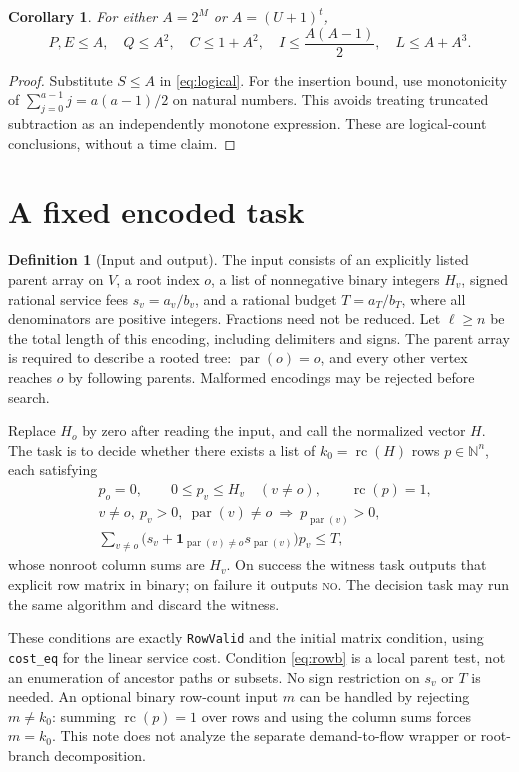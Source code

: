 \documentclass[11pt,a4paper]{article}
\newtheorem{corollary}[theorem]{Corollary}
\theoremstyle{definition}
\newtheorem{definition}[theorem]{Definition}
\theoremstyle{remark}
\newcommand{\NN}{\mathbb N}
\newcommand{\pa}{\operatorname{par}}
\newcommand{\RC}{\operatorname{rc}}
\begin{document}
\begin{corollary}\label{cor:envelope}
For either \(A=2^M\) or \(A=(U+1)^t\),
\[
 P,E\le A,\quad Q\le A^2,\quad C\le1+A^2,\quad
 I\le\frac{A(A-1)}2,\quad L\le A+A^3.
\]
\end{corollary}
\begin{proof}
Substitute \(S\le A\) in \eqref{eq:logical}. For the insertion bound,
use monotonicity of \(\sum_{j=0}^{a-1}j=a(a-1)/2\) on natural numbers.
This avoids treating truncated subtraction as an independently monotone
expression. These are logical-count conclusions, without a time claim.
\end{proof}

\section{A fixed encoded task}\label{sec:task}
\begin{definition}[Input and output]\label{def:task}
The input consists of an explicitly listed parent array on \(V\), a root
index \(o\), a list of nonnegative binary integers \(H_v\), signed rational
service fees \(s_v=a_v/b_v\), and a rational budget \(T=a_T/b_T\), where
all denominators are positive integers. Fractions need not be reduced.
Let \(\ell\ge n\) be the total length of this encoding, including delimiters
and signs. The parent array is required to describe a rooted tree:
\(\pa(o)=o\), and every other vertex reaches \(o\) by following parents.
Malformed encodings may be rejected before search.

Replace \(H_o\) by zero after reading the input, and call the normalized
vector \(H\). The task is to decide whether there exists a list of
\(k_0=\RC(H)\) rows \(p\in\NN^n\), each satisfying
\begin{align}
 &p_o=0,\qquad 0\le p_v\le H_v\quad(v\ne o),\qquad\RC(p)=1,
       \label{eq:rowa}\\
 &v\ne o,\ p_v>0,\ \pa(v)\ne o\ \Longrightarrow\ p_{\pa(v)}>0,
       \label{eq:rowb}\\
 &\sum_{v\ne o}\bigl(s_v+\mathbf1_{\pa(v)\ne o}s_{\pa(v)}\bigr)p_v\le T,
       \label{eq:rowc}
\end{align}
whose nonroot column sums are \(H_v\). On success the witness task outputs
that explicit row matrix in binary; on failure it outputs \textsc{no}.
The decision task may run the same algorithm and discard the witness.
\end{definition}

These conditions are exactly \texttt{RowValid} and the initial matrix
condition, using \texttt{cost\_eq} for the linear service cost. Condition
\eqref{eq:rowb} is a local parent test, not an enumeration of ancestor paths
or subsets. No sign restriction on \(s_v\) or \(T\) is needed.
An optional binary row-count input \(m\) can be handled by rejecting
\(m\ne k_0\): summing \(\RC(p)=1\) over rows and using the column sums
forces \(m=k_0\). This note does not analyze the separate demand-to-flow
wrapper or root-branch decomposition.
\end{document}
